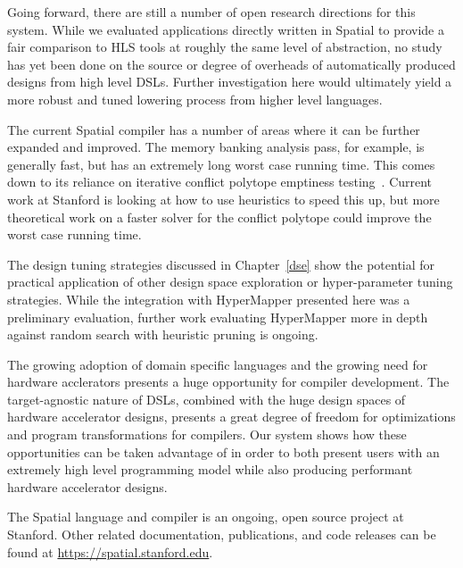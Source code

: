 Going forward, there are still a number of open research directions for this system.
While we evaluated applications directly written in Spatial to provide a fair
comparison to HLS tools at roughly the same level of abstraction, no study has yet
been done on the source or degree of overheads of automatically produced designs
from high level DSLs. Further investigation here would ultimately yield a more robust
and tuned lowering process from higher level languages.

The current Spatial compiler has a number of areas where it can be further expanded and
improved. The memory banking analysis pass, for example, is generally fast, but has
an extremely long worst case running time. This comes down to its reliance on
iterative conflict polytope emptiness testing~\cite{Wang_banking}. Current work
at Stanford is looking at how to use heuristics to speed this up, but more theoretical
work on a faster solver for the conflict polytope could improve the worst case running time.

The design tuning strategies discussed in Chapter~\ref{dse} show the potential for
practical application of other design space exploration or hyper-parameter tuning
strategies. While the integration with HyperMapper presented here was a preliminary
evaluation, further work evaluating HyperMapper more in depth against random search
with heuristic pruning is ongoing.

The growing adoption of domain specific languages and the growing need for hardware
acclerators presents a huge opportunity for compiler development. The target-agnostic
nature of DSLs, combined with the huge design spaces of hardware accelerator designs,
presents a great degree of freedom for optimizations and program transformations
for compilers. Our system shows how these opportunities can be taken advantage of
in order to both present users with an extremely high level programming model while
also producing performant hardware accelerator designs.

The Spatial language and compiler is an ongoing, open source project at Stanford.
Other related documentation, publications, and code releases can be found
at \url{https://spatial.stanford.edu}.
